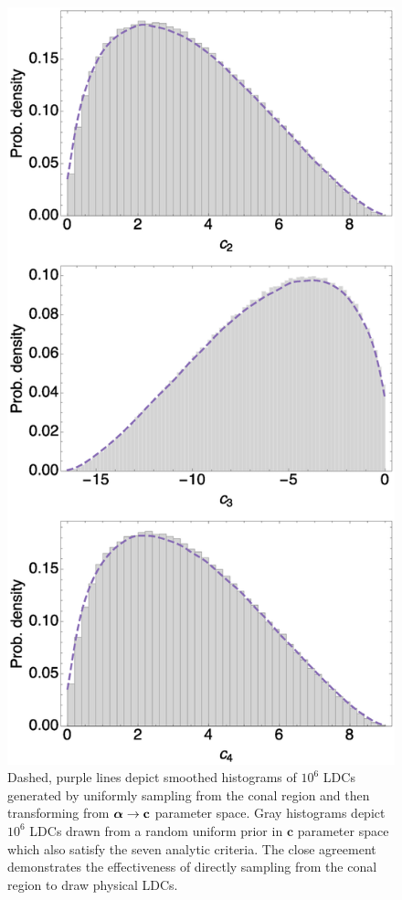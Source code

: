 \begin{figure}
\includegraphics[width=\columnwidth]{chistos.eps}
\caption{
Dashed, purple lines depict smoothed histograms of $10^6$ LDCs generated by 
uniformly sampling from the conal region and then transforming from $\boldsymbol{\alpha} 
\to \mathbf{c}$ parameter space. Gray histograms depict $10^6$ LDCs drawn from a 
random uniform prior in $\mathbf{c}$ parameter space which also satisfy the 
seven analytic criteria. The close agreement demonstrates the effectiveness of 
directly sampling from the conal region to draw physical LDCs.
}
\label{fig:chistos}
\end{figure}
